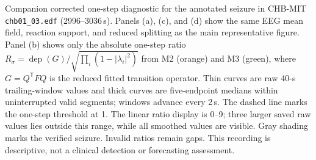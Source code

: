 \caption{Companion corrected one-step diagnostic for the annotated seizure in CHB-MIT \texttt{chb01\_03.edf} (2996--3036\,s). Panels (a), (c), and (d) show the same EEG mean field, reaction support, and reduced splitting as the main representative figure. Panel (b) shows only the absolute one-step ratio \(R_\sigma=\operatorname{dep}(G)/\sqrt{\prod_i(1-|\lambda_i|^2)}\) from M2 (orange) and M3 (green), where \(G=Q^{\mathsf T}FQ\) is the reduced fitted transition operator. Thin curves are raw 40-s trailing-window values and thick curves are five-endpoint medians within uninterrupted valid segments; windows advance every 2\,s. The dashed line marks the one-step threshold at 1. The linear ratio display is 0--9; three larger saved raw values lies outside this range, while all smoothed values are visible. Gray shading marks the verified seizure. Invalid ratios remain gaps. This recording is descriptive, not a clinical detection or forecasting assessment.}
